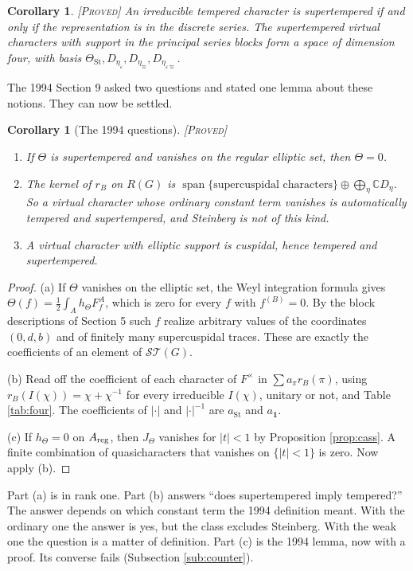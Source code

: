 \documentclass[12pt,letterpaper]{amsart}
\numberwithin{equation}{section}
\newtheorem{corollary}[theorem]{Corollary}
\theoremstyle{definition}
\theoremstyle{remark}
\newcommand{\St}{\mathrm{St}}
\newcommand{\triv}{\mathbf 1}
\newcommand{\ST}{\mathcal{ST}}
\newcommand{\status}[1]{\textup{[\textsc{#1}]}}
\begin{document}
\begin{corollary}\label{cor:irr}\status{Proved}
An irreducible tempered character is supertempered if and only if the representation is in the discrete series. The supertempered virtual characters with support in the principal series blocks form a space of dimension four, with basis $\Theta_{\St},D_{\eta_\varepsilon},D_{\eta_\varpi},D_{\eta_{\varepsilon\varpi}}$.
\end{corollary}

The 1994 Section 9 asked two questions and stated one lemma about these notions. They can now be settled.

\begin{corollary}[The 1994 questions]\label{cor:1994}\status{Proved}
\begin{enumerate}[label=(\alph*),leftmargin=*]
\item If $\Theta$ is supertempered and vanishes on the regular elliptic set, then $\Theta=0$.
\item The kernel of $r_B$ on $R(G)$ is $\operatorname{span}\{\text{supercuspidal characters}\}\oplus\bigoplus_\eta\mathbb CD_\eta$. So a virtual character whose \emph{ordinary} constant term vanishes is automatically tempered and supertempered, and Steinberg is not of this kind.
\item A virtual character with elliptic support is cuspidal, hence tempered and supertempered.
\end{enumerate}
\end{corollary}
\begin{proof}
(a) If $\Theta$ vanishes on the elliptic set, the Weyl integration formula gives $\Theta(f)=\tfrac12\int_Ah_\Theta F_f^A$, which is zero for every $f$ with $f^{(B)}=0$. By the block descriptions of Section 5 such $f$ realize arbitrary values of the coordinates $(0,d,b)$ and of finitely many supercuspidal traces. These are exactly the coefficients of an element of $\ST(G)$.

(b) Read off the coefficient of each character of $F^\times$ in $\sum a_\pi r_B(\pi)$, using $r_B(I(\chi))=\chi+\chi^{-1}$ for every irreducible $I(\chi)$, unitary or not, and Table \ref{tab:four}. The coefficients of $|\cdot|$ and $|\cdot|^{-1}$ are $a_{\St}$ and $a_{\triv}$.

(c) If $h_\Theta=0$ on $A_{\rm reg}$, then $J_\Theta$ vanishes for $|t|<1$ by Proposition \ref{prop:cass}. A finite combination of quasicharacters that vanishes on $\{|t|<1\}$ is zero. Now apply (b).
\end{proof}
Part (a) is \cite[Theorem 3.2]{He94} in rank one. Part (b) answers ``does supertempered imply tempered?'' The answer depends on which constant term the 1994 definition meant. With the ordinary one the answer is yes, but the class excludes Steinberg. With the weak one the question is a matter of definition. Part (c) is the 1994 lemma, now with a proof. Its converse fails (Subsection \ref{sub:counter}).
\end{document}

